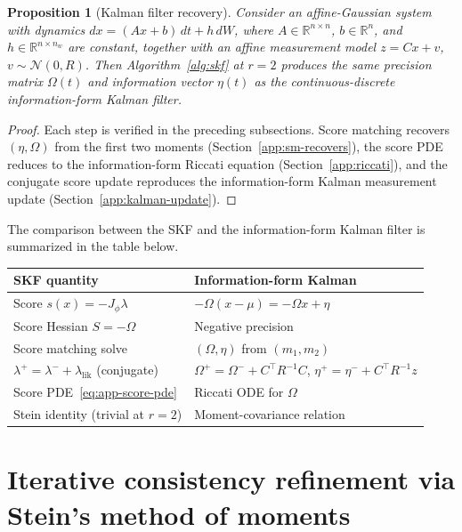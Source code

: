 \documentclass{article}
\newcommand{\R}{\mathbb{R}}
\newtheorem{proposition}{Proposition}
\theoremstyle{definition}
\begin{document}
\begin{proposition}[Kalman filter recovery]\label{thm:kf}
Consider an affine-Gaussian system with dynamics
$dx = (Ax+b)\,dt + h\,dW$, where $A \in \R^{n \times n}$, $b \in \R^n$,
and $h \in \R^{n \times n_w}$ are constant, together with an affine
measurement model $z = Cx + v$, $v \sim \mathcal{N}(0, R)$.
Then Algorithm~\ref{alg:skf} at $r = 2$ produces the same
precision matrix $\Omega(t)$ and information vector $\eta(t)$
as the continuous-discrete information-form Kalman filter.
\end{proposition}

\begin{proof}
Each step is verified in the preceding subsections. Score matching recovers
$(\eta, \Omega)$ from the first two moments (Section~\ref{app:sm-recovers}),
the score PDE reduces to the information-form Riccati equation
(Section~\ref{app:riccati}),
and the conjugate score update reproduces the information-form
Kalman measurement update (Section~\ref{app:kalman-update}).
\end{proof}

The comparison between the SKF and the information-form Kalman filter is summarized in the table below.

\begin{center}
\renewcommand{\arraystretch}{1.2}
\small
\begin{tabular}{ll}
\toprule
\textbf{SKF quantity} & \textbf{Information-form Kalman} \\
\midrule
Score $s(x) = -J_\phi\lambda$ & $-\Omega(x-\mu) = -\Omega x + \eta$ \\
Score Hessian $S = -\Omega$ & Negative precision \\
Score matching solve & $(\Omega, \eta)$ from $(m_1, m_2)$ \\
$\lambda^+ = \lambda^- + \lambda_{\mathrm{lik}}$ (conjugate) &
  $\Omega^+ = \Omega^- + C^\top R^{-1}C$, $\eta^+ = \eta^- + C^\top R^{-1}z$ \\
Score PDE~\eqref{eq:app-score-pde} & Riccati ODE for $\Omega$ \\
Stein identity (trivial at $r=2$) & Moment-covariance relation \\
\bottomrule
\end{tabular}
\end{center}

\section{Iterative consistency refinement via Stein's method of moments}
\label{app:smom}
\end{document}
